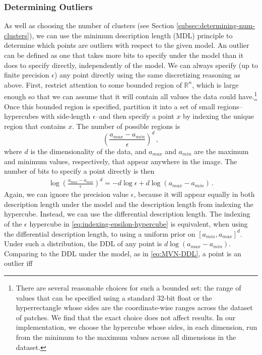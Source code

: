 \documentclass[a4paper,fleqn]{cas-sc}
\theoremstyle{remark}
\begin{document}
\subsubsection{Determining Outliers}
As well as choosing the number of clusters (see Section \ref{subsec:determining-num-clusters}), 
we can use the minimum description length (MDL) principle to determine which points are outliers with respect to the given model. An outlier can be defined as one that takes more bits to specify under the model than it does to specify directly, independently of the model. We can always specify (up to finite precision $\epsilon$) any point directly using the same discretizing reasoning as above. First, restrict attention to some bounded region of $\mathbb{R}^n$, which is large enough so that we can assume that it will contain all values the data could have.\footnote{There are several reasonable choices for such a bounded set: the range of values that can be specified using a standard 32-bit float or the hyperrectangle whose sides are the coordinate-wise ranges across the dataset of patches. We find that the exact choice does not affect results. In our implementation, we choose the hypercube whose sides, in each dimension, run from the minimum to the maximum values across all dimensions in the dataset.} Once this bounded region is specified, partition it into a set of small regions--hypercubes with side-length $\epsilon$--and then specify a point $x$ by indexing the unique region that contains $x$. The number of possible regions is 
\[
\left(\frac{a_{max}-a_{min}}{\epsilon}\right)^d\,,
\]
where $d$ is the dimensionality of the data, and $a_{max}$ and $a_{min}$ are the maximum and minimum values, respectively, that appear anywhere in the image. The number of bits to specify a point directly is then 
\begin{align} \label{eq:indexing-epsilon-hypercube}
    \log \left(\frac{a_{max}-a_{min}}{\epsilon}\right)^d = -d \log \epsilon + d \log (a_{max}-a_{min})\,.
\end{align}
Again, we can ignore the precision value $\epsilon$, because it will appear equally in both description length under the model and the description length from indexing the hypercube. Instead, we can use the differential description length. The indexing of the $\epsilon$ hypercube in \eqref{eq:indexing-epsilon-hypercube} is equivalent, when using the differential description length, to using a uniform prior on $[a_{min},a_{max}]^d$. Under such a distribution, the DDL of any point is $d \log (a_{max}-a_{min})$.
Comparing to the DDL under the model, as in \eqref{eq:MVN-DDL}, a point is an outlier iff
\end{document}
